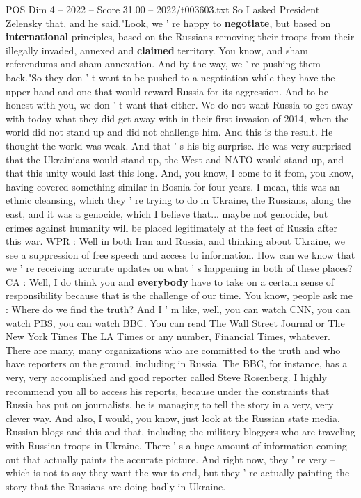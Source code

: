 \begin{textsample}{POS Dim 4 – 2022 – Score 31.00 – 2022/t003603.txt}
So I asked President Zelensky that, and he said,"Look, we ' re happy to \textbf{negotiate}, but based on \textbf{international} principles, based on the Russians removing their troops from their illegally invaded, annexed and \textbf{claimed} territory.
You know, and sham referendums and sham annexation.
And by the way, we ' re pushing them back."So they don ' t want to be pushed to a negotiation while they have the upper hand and one that would reward Russia for its aggression.
And to be honest with you, we don ' t want that either.
We do not want Russia to get away with today what they did get away with in their first invasion of 2014, when the world did not stand up and did not challenge him.
And this is the result.
He thought the world was weak.
And that ' s his big surprise.
He was very surprised that the Ukrainians would stand up, the West and NATO would stand up, and that this unity would last this long.
And, you know, I come to it from, you know, having covered something similar in Bosnia for four years.
I mean, this was an ethnic cleansing, which they ' re trying to do in Ukraine, the Russians, along the east, and it was a genocide, which I believe that... maybe not genocide, but crimes against humanity will be placed legitimately at the feet of Russia after this war.
WPR : Well in both Iran and Russia, and thinking about Ukraine, we see a suppression of free speech and access to information.
How can we know that we ' re receiving accurate updates on what ' s happening in both of these places?
CA : Well, I do think you and \textbf{everybody} have to take on a certain sense of responsibility because that is the challenge of our time.
You know, people ask me : Where do we find the truth?
And I ' m like, well, you can watch CNN, you can watch PBS, you can watch BBC.
You can read The Wall Street Journal or The New York Times The LA Times or any number, Financial Times, whatever.
There are many, many organizations who are committed to the truth and who have reporters on the ground, including in Russia.
The BBC, for instance, has a very, very accomplished and good reporter called Steve Rosenberg.
I highly recommend you all to access his reports, because under the constraints that Russia has put on journalists, he is managing to tell the story in a very, very clever way.
And also, I would, you know, just look at the Russian state media, Russian blogs and this and that, including the military bloggers who are traveling with Russian troops in Ukraine.
There ' s a huge amount of information coming out that actually paints the accurate picture.
And right now, they ' re very -- which is not to say they want the war to end, but they ' re actually painting the story that the Russians are doing badly in Ukraine.

\end{textsample}
